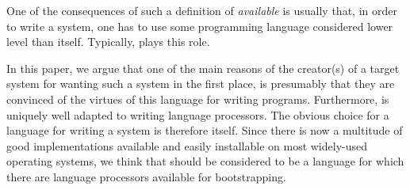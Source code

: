 One of the consequences of such a definition of \emph{available} is
usually that, in order to write a \commonlisp{} system, one has to use
some programming language considered lower level than \commonlisp{}
itself.  Typically, \clanguage{} plays this role.

In this paper, we argue that one of the main reasons of the creator(s)
of a target \commonlisp{} system for wanting such a system in the
first place, is presumably that they are convinced of the virtues of
this language for writing programs.  Furthermore, \commonlisp{} is
uniquely well adapted to writing language processors.  The obvious
choice for a language for writing a \commonlisp{} system is therefore
\commonlisp{} itself.  Since there is now a multitude of good
\commonlisp{} implementations available and easily installable on most
widely-used operating systems, we think that \commonlisp{} should be
considered to be a language for which there are language processors
available for bootstrapping.

